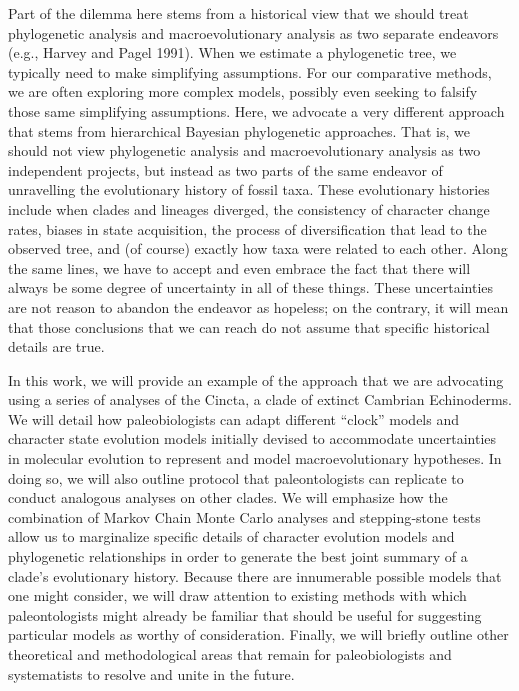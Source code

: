 \documentclass{article}
\begin{document}
Part of the dilemma here stems from a historical view that we should treat phylogenetic analysis and macroevolutionary analysis as two separate endeavors (e.g., Harvey and Pagel 1991).  
When we estimate a phylogenetic tree, we typically need to make simplifying assumptions.
For our comparative methods, we are often exploring more complex models, possibly even seeking to falsify those same simplifying assumptions.
Here, we advocate a very different approach that stems from hierarchical Bayesian phylogenetic approaches.  
That is, we should not view phylogenetic analysis and macroevolutionary analysis as two independent projects, but instead as two parts of the same endeavor of unravelling the evolutionary history of fossil taxa.  
These evolutionary histories include when clades and lineages diverged, the consistency of character change rates, biases in state acquisition, the process of diversification that lead to the observed tree, and (of course) exactly how taxa were related to each other.  
Along the same lines, we have to accept and even embrace the fact that there will always be some degree of uncertainty in all of these things.  
These uncertainties are not reason to abandon the endeavor as hopeless; on the contrary, it will mean that those conclusions that we can reach do not assume that specific historical details are true.  

In this work, we will provide an example of the approach that we are advocating using a series of analyses of the Cincta, a clade of extinct Cambrian Echinoderms. 
We will detail how paleobiologists can adapt different “clock” models and character state evolution models initially devised to accommodate uncertainties in molecular evolution to represent and model macroevolutionary hypotheses.  
In doing so, we will also outline protocol that paleontologists can replicate to conduct analogous analyses on other clades.  
We will emphasize how the combination of Markov Chain Monte Carlo analyses and stepping‑stone tests allow us to marginalize specific details of character evolution models and phylogenetic relationships in order to generate the best joint summary of a clade’s evolutionary history.  
Because there are innumerable possible models that one might consider, we will draw attention to existing methods with which paleontologists might already be familiar that should be useful for suggesting particular models as worthy of consideration.  
Finally, we will briefly outline other theoretical and methodological areas that remain for paleobiologists and systematists to resolve and unite in the future. 
\end{document}
